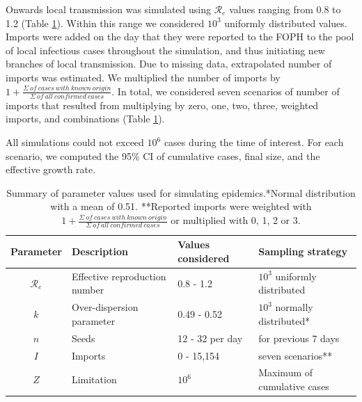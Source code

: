 \documentclass[10pt, a4paper, twoside]{article}
\begin{document}
\begin{multicols}{2}
Onwards local transmission was simulated using $\mathcal{R}_e$ values ranging from 0.8 to 1.2 (Table \ref{t1}).
Within this range we considered $10^3$ uniformly distributed values.
Imports were added on the day that they were reported to the FOPH to the pool of local infectious cases throughout the simulation, and thus initiating new branches of local transmission.
Due to missing data, extrapolated number of imports was estimated.
We multiplied the number of imports by $1+ \frac{\Sigma ~of ~cases ~with ~known ~origin }{\Sigma ~of ~all ~confirmed ~cases}$.
In total, we considered seven scenarios of number of imports that resulted from multiplying by zero, one, two, three, weighted imports, and combinations (Table \ref{t1}).

All simulations could not exceed $10^6$ cases during the time of interest.
For each scenario, we computed the 95\% CI of cumulative cases, final size, and the effective growth rate.

\begin{table}[h]
	\centering
\caption{Summary of parameter values used for simulating epidemics.*Normal distribution with a mean of 0.51. **Reported imports were weighted with $1+ \frac{\Sigma ~of ~cases ~with ~known ~origin }{\Sigma ~of ~all ~confirmed ~cases}$ or multiplied with 0, 1, 2 or 3.}
\label{t1}
\begin{tabular}{clll}
	\hline
	Parameter & Description & Values considered & Sampling strategy\\
	\hline
	$\mathcal{R}_e$ & Effective reproduction number & 0.8 - 1.2 & $10^3$ uniformly distributed\\
	$k$ & Over-dispersion parameter & 0.49 - 0.52 & $10^3$ normally distributed*\\
	$n$ & Seeds & 12 - 32 per day & for previous 7 days\\
	$I$ & Imports & 0 - 15,154 & seven scenarios**\\
	$Z$ & Limitation & $10^6$ & Maximum of cumulative cases\\
	\hline
\end{tabular}
\end{table}


\end{multicols}
\end{document}
